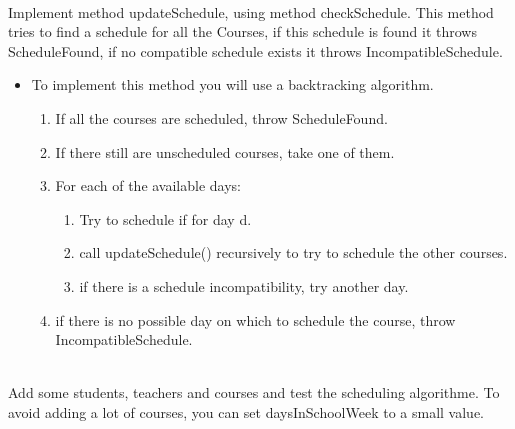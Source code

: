 \documentclass{exercices}
\begin{document}
\begin{exercice}\\
Implement method updateSchedule, using method checkSchedule.
This method tries to find a schedule for all the Courses, if this schedule is found it throws
ScheduleFound, if no compatible schedule exists it throws IncompatibleSchedule.

\begin{itemize}
\item To implement this method you will use a backtracking algorithm. 
\begin{enumerate}
  \item If all the courses are scheduled, throw ScheduleFound.
  \item If there still are unscheduled courses, take one of them.
  \item For each of the available days:
  \begin{enumerate}
    \item Try to schedule if for day d.
    \item call updateSchedule() recursively to try to schedule the other courses.
    \item if there is a schedule incompatibility, try another day.
  \end{enumerate}
  \item if there is no possible day on which to schedule the course, throw IncompatibleSchedule. 
\end{enumerate}
\end{itemize}
\end{exercice}
\begin{exercice}\\
Add some students, teachers and courses and test the scheduling algorithme. 
To avoid adding a lot of courses, you can set daysInSchoolWeek to a small value.
\end{exercice}
\end{document}
